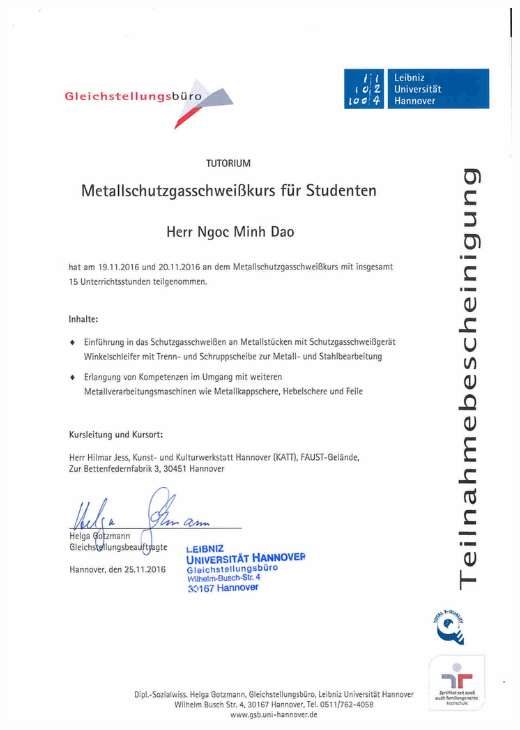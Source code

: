 \documentclass[12pt,a4paper]{scrartcl}
\begin{document}
\newpage
\includegraphics[width=\linewidth, height=\textheight]
{./zeugnisse/schweissenkurs_lq.jpg}
\end{document}

